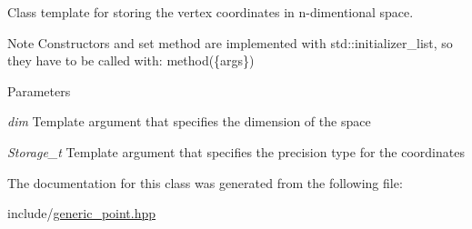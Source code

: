 Class template for storing the vertex coordinates in n-\/dimentional space. \begin{DoxyNote}{Note}
Constructors and set method are implemented with std::initializer\_\-list, so they have to be called with: method(\{args\}) 
\end{DoxyNote}

\begin{DoxyParams}{Parameters}
\item[{\em dim}]Template argument that specifies the dimension of the space \item[{\em Storage\_\-t}]Template argument that specifies the precision type for the coordinates \end{DoxyParams}


The documentation for this class was generated from the following file:\begin{DoxyCompactItemize}
\item 
include/\hyperlink{generic__point_8hpp}{generic\_\-point.hpp}\end{DoxyCompactItemize}
